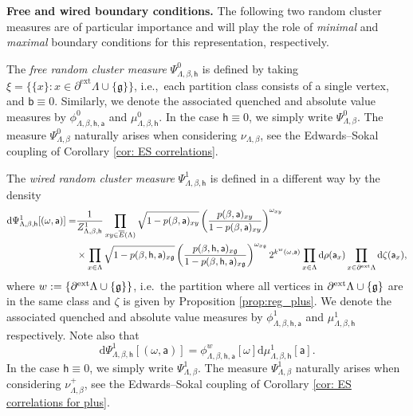 \documentclass[11pt,a4paper]{article}
\numberwithin{equation}{section}
\theoremstyle{plain}
\theoremstyle{definition}
\newcommand\fg{\mathfrak{g}}
\begin{document}
\hfill

\noindent \textbf{Free and wired boundary conditions.} The following two random cluster measures are of particular importance and will play the role of \emph{minimal} and \emph{maximal} boundary conditions for this representation, respectively.

 The \emph{free random cluster measure} $\Psi_{\Lambda,\beta, \mathsf h}^{0}$ is defined by taking $\xi=\{\{x\}: x\in \partial^{\mathrm{ext}} \Lambda\cup \{\fg\}\}$, i.e.,\ each partition class consists of a single vertex,
and $\mathsf{b}\equiv 0$. Similarly, we denote the associated quenched and absolute value measures by  $\phi^{0}_{\Lambda,\beta,\mathsf{h}, \mathsf a}$ and $\mu_{\Lambda,\beta,\mathsf{h}}^{0}$.  In the case $\mathsf{h}\equiv0$, we simply write $\Psi^0_{\Lambda,\beta}$. The measure $\Psi^0_{\Lambda,\beta}$ naturally arises when considering $\nu_{\Lambda,\beta}$, see the Edwards--Sokal coupling of Corollary \ref{cor: ES correlations}.

The \emph{wired random cluster measure} $\Psi^1_{\Lambda,\beta, \mathsf h}$ is defined in a different way by the density
\begin{equation}\label{eq: random cluster explicit density wired}
\begin{aligned}
\mathrm{d}\Psi^1_{\Lambda,\beta,\mathsf{h}}[(\omega, \mathsf a)]=&\frac{1}{Z^{1}_{\Lambda,\beta,\mathsf{h}}}\prod_{xy \in \overline{E}(\Lambda)} \sqrt{1-p(\beta,\mathsf a)_{xy}}\left(\frac{p(\beta,\mathsf a)_{xy}}{1-p(\beta,\mathsf a)_{xy}}\right)^{\omega_{xy}}
\\&\times \prod_{x\in \Lambda} \sqrt{1-p(\beta, \mathsf h, \mathsf a)_{x\fg}}\left(\frac{p(\beta, \mathsf{h}, \mathsf a)_{x\fg}}{1-p(\beta,\mathsf{h}, \mathsf a)_{x\fg}}\right)^{\omega_{x\fg}} 2^{k^w(\omega,\mathsf{a})} 
\prod_{x\in \Lambda}\mathrm{d} \rho(\mathsf{a}_x) \prod_{x \in \partial^{\textup{ext}} \Lambda} \mathrm{d}\zeta(\mathsf a_x),
\end{aligned}
\end{equation}
where $w := \{ \partial^{\textup{ext}} \Lambda\cup \{\fg\}\}$, i.e.\ the partition where all vertices in $\partial^{\textup{ext}} \Lambda\cup \{\fg\}$ are in the same class and $\zeta$ is given by Proposition \ref{prop:reg_plus}. We denote the associated quenched and absolute value measures by $\phi^{1}_{\Lambda,\beta, \mathsf h, \mathsf a}$ and $\mu_{\Lambda,\beta, \mathsf h}^{1}$ respectively. Note also that
\begin{equation} \label{eq: psi-phi-mu plus}
    \mathrm d \Psi^1_{\Lambda, \beta, \mathsf h}[(\omega,\mathsf a)] = \phi^w_{\Lambda,\beta,\mathsf h, \mathsf a}[\omega] \mathrm d\mu^1_{\Lambda,\beta,\mathsf h}[\mathsf{a}].
\end{equation} 
In the case $\mathsf h\equiv 0$, we simply write $\Psi^1_{\Lambda,\beta}$. The measure $\Psi^1_{\Lambda,\beta}$ naturally arises when considering $\nu^+_{\Lambda,\beta}$, see the Edwards--Sokal coupling of Corollary \ref{cor: ES correlations for plus}. 
\end{document}
